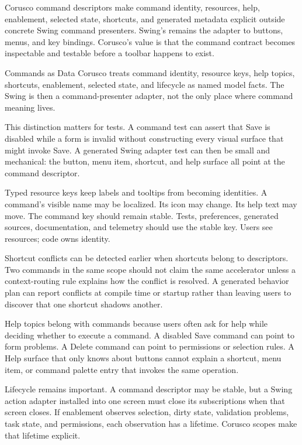 Corusco command descriptors make command identity, resources, help, enablement, selected state, shortcuts, and generated metadata explicit outside concrete Swing command presenters. Swing's  remains the adapter to buttons, menus, and key bindings. Corusco's value is that the command contract becomes inspectable and testable before a toolbar happens to exist.

\begin{coruscobox}{Commands as Data}
Corusco treats command identity, resource keys, help topics, shortcuts, enablement, selected state, and lifecycle as named model facts. The Swing  is then a command-presenter adapter, not the only place where command meaning lives.
\end{coruscobox}

This distinction matters for tests. A command test can assert that Save is disabled while a form is invalid without constructing every visual surface that might invoke Save. A generated Swing adapter test can then be small and mechanical: the button, menu item, shortcut, and help surface all point at the command descriptor.

Typed resource keys keep labels and tooltips from becoming identities. A command's visible name may be localized. Its icon may change. Its help text may move. The command key should remain stable. Tests, preferences, generated sources, documentation, and telemetry should use the stable key. Users see resources; code owns identity.

Shortcut conflicts can be detected earlier when shortcuts belong to descriptors. Two commands in the same scope should not claim the same accelerator unless a context-routing rule explains how the conflict is resolved. A generated behavior plan can report conflicts at compile time or startup rather than leaving users to discover that one shortcut shadows another.

Help topics belong with commands because users often ask for help while deciding whether to execute a command. A disabled Save command can point to form problems. A Delete command can point to permissions or selection rules. A Help surface that only knows about buttons cannot explain a shortcut, menu item, or command palette entry that invokes the same operation.

Lifecycle remains important. A command descriptor may be stable, but a Swing action adapter installed into one screen must close its subscriptions when that screen closes. If enablement observes selection, dirty state, validation problems, task state, and permissions, each observation has a lifetime. Corusco scopes make that lifetime explicit.

